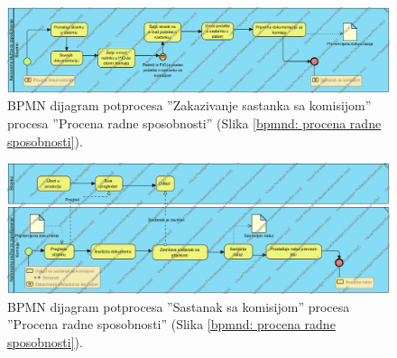 \begin{mylandscape}
	\newpage
	
	\begin{figure}[H]
		\centering
		\includegraphics[width=0.8\paperwidth]{dijagrami/bpmn-dijagrami/zakazivanje-sastanka-sa-komisijom.png}
		\caption{BPMN dijagram potprocesa ''Zakazivanje sastanka sa komisijom'' procesa ''Procena radne sposobnosti''  (Slika \ref{bpmnd: procena radne sposobnosti}).}
	\end{figure}

	\newpage
	
	\begin{figure}[H]
		\centering
		\includegraphics[width=0.8\paperwidth]{dijagrami/bpmn-dijagrami/sastanak-sa-komisijom.png}
		\caption{BPMN dijagram potprocesa ''Sastanak sa komisijom'' procesa ''Procena radne sposobnosti''  (Slika \ref{bpmnd: procena radne sposobnosti}).}
	\end{figure}
\end{mylandscape}

